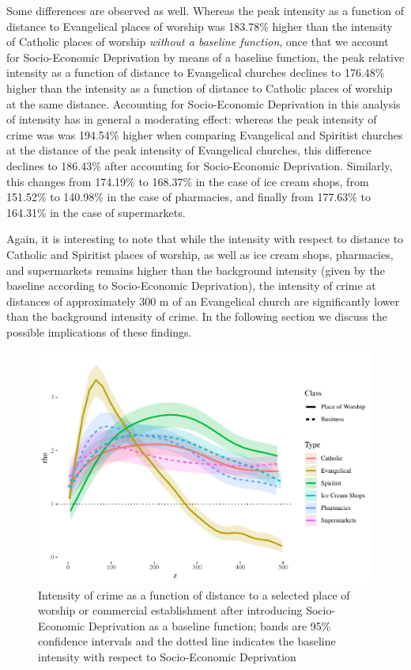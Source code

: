 \documentclass[smallextended]{svjour3}       %
\begin{document}
Some differences are observed as well. Whereas the peak intensity as a
function of distance to Evangelical places of worship was 183.78\%
higher than the intensity of Catholic places of worship \emph{without a
baseline function}, once that we account for Socio-Economic Deprivation
by means of a baseline function, the peak relative intensity as a
function of distance to Evangelical churches declines to 176.48\% higher
than the intensity as a function of distance to Catholic places of
worship at the same distance. Accounting for Socio-Economic Deprivation
in this analysis of intensity has in general a moderating effect:
whereas the peak intensity of crime was was 194.54\% higher when
comparing Evangelical and Spiritist churches at the distance of the peak
intensity of Evangelical churches, this difference declines to 186.43\%
after accounting for Socio-Economic Deprivation. Similarly, this changes
from 174.19\% to 168.37\% in the case of ice cream shops, from 151.52\%
to 140.98\% in the case of pharmacies, and finally from 177.63\% to
164.31\% in the case of supermarkets.

Again, it is interesting to note that while the intensity with respect
to distance to Catholic and Spiritist places of worship, as well as ice
cream shops, pharmacies, and supermarkets remains higher than the
background intensity (given by the baseline according to Socio-Economic
Deprivation), the intensity of crime at distances of approximately 300 m
of an Evangelical church are significantly lower than the background
intensity of crime. In the following section we discuss the possible
implications of these findings.

\begin{figure}
\centering
\includegraphics{Moral_Communities_and_Crime_files/figure-latex/figure-plot-relative-distribution-with-baseline-1.pdf}
\caption{\label{fig:plot-relative-distribution-with-baseline}Intensity
of crime as a function of distance to a selected place of worship or
commercial establishment after introducing Socio-Economic Deprivation as
a baseline function; bands are 95\% confidence intervals and the dotted
line indicates the baseline intensity with respect to Socio-Economic
Deprivation}
\end{figure}
\end{document}
